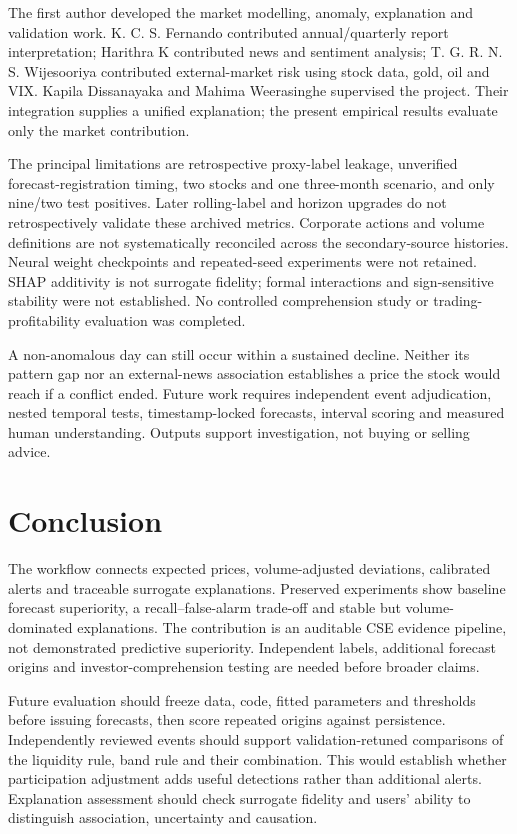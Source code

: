 \documentclass[conference]{IEEEtran}
\begin{document}
The first author developed the market modelling, anomaly, explanation and validation work. K. C. S. Fernando contributed annual/quarterly report interpretation; Harithra K contributed news and sentiment analysis; T. G. R. N. S. Wijesooriya contributed external-market risk using stock data, gold, oil and VIX. Kapila Dissanayaka and Mahima Weerasinghe supervised the project. Their integration supplies a unified explanation; the present empirical results evaluate only the market contribution.

The principal limitations are retrospective proxy-label leakage, unverified forecast-registration timing, two stocks and one three-month scenario, and only nine/two test positives. Later rolling-label and horizon upgrades do not retrospectively validate these archived metrics. Corporate actions and volume definitions are not systematically reconciled across the secondary-source histories. Neural weight checkpoints and repeated-seed experiments were not retained. SHAP additivity is not surrogate fidelity; formal interactions and sign-sensitive stability were not established. No controlled comprehension study or trading-profitability evaluation was completed.

\noindent\parbox{\columnwidth}{A non-anomalous day can still occur within a sustained decline. Neither its pattern gap nor an external-news association establishes a price the stock would reach if a conflict ended. Future work requires independent event adjudication, nested temporal tests, timestamp-locked forecasts, interval scoring and measured human understanding. Outputs support investigation, not buying or selling advice.}\par

\newpage
\section{Conclusion}
The workflow connects expected prices, volume-adjusted deviations, calibrated alerts and traceable surrogate explanations. Preserved experiments show baseline forecast superiority, a recall--false-alarm trade-off and stable but volume-dominated explanations. The contribution is an auditable CSE evidence pipeline, not demonstrated predictive superiority. Independent labels, additional forecast origins and investor-comprehension testing are needed before broader claims.

Future evaluation should freeze data, code, fitted parameters and thresholds before issuing forecasts, then score repeated origins against persistence. Independently reviewed events should support validation-retuned comparisons of the liquidity rule, band rule and their combination. This would establish whether participation adjustment adds useful detections rather than additional alerts. Explanation assessment should check surrogate fidelity and users' ability to distinguish association, uncertainty and causation.
\end{document}
